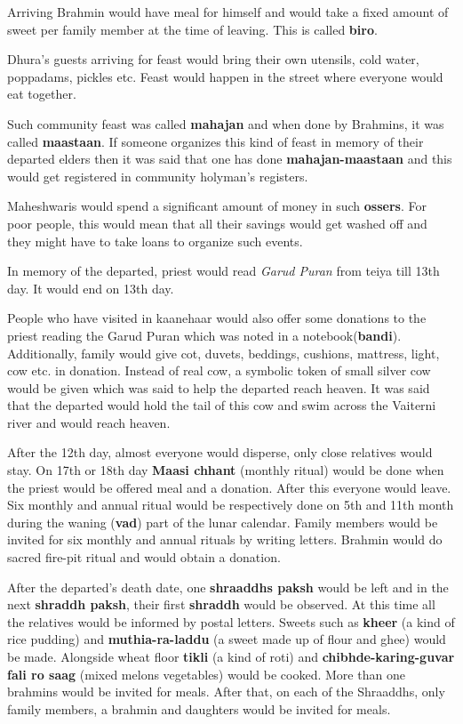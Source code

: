 Arriving Brahmin would have meal for himself and would take a fixed amount of
sweet per family member at the time of leaving. This is called \textbf{biro}.

Dhura's guests arriving for feast would bring their own utensils, cold water,
poppadams, pickles etc. Feast would happen in the street where everyone would
eat together.

Such community feast was called \textbf{mahajan} and when done by Brahmins, it
was called \textbf{maastaan}. If someone organizes this kind of feast in memory
of their departed elders then it was said that one has done
\textbf{mahajan-maastaan} and this would get registered in community holyman's
registers.

Maheshwaris would spend a significant amount of money in such \textbf{ossers}.
For poor people, this would mean that all their savings would get washed off
and they might have to take loans to organize such events.

In memory of the departed, priest would read \textit{Garud Puran} from teiya
till 13th day. It would end on 13th day.

People who have visited in kaanehaar would also offer some donations to the
priest reading the Garud Puran which was noted in a notebook(\textbf{bandi}).
Additionally, family would give cot, duvets, beddings, cushions, mattress,
light, cow etc. in donation. Instead of real cow, a symbolic token of small
silver cow would be given which was said to help the departed reach heaven. It
was said that the departed would hold the tail of this cow and swim across the
Vaiterni river and would reach heaven.

After the 12th day, almost everyone would disperse, only close relatives would
stay. On 17th or 18th day \textbf{Maasi chhant} (monthly ritual) would be done
when the priest would be offered meal and a donation. After this everyone would
leave. Six monthly and annual ritual would be respectively done on 5th and 11th
month during the waning (\textbf{vad}) part of the lunar calendar. Family
members would be invited for six monthly and annual rituals by writing letters.
Brahmin would do sacred fire-pit ritual and would obtain a donation.

After the departed's death date, one \textbf{shraaddhs paksh} would be left and
in the next \textbf{shraddh paksh}, their first \textbf{shraddh} would be
observed. At this time all the relatives would be informed by postal letters.
Sweets such as \textbf{kheer} (a kind of rice pudding) and
\textbf{muthia-ra-laddu} (a sweet made up of flour and ghee) would be made.
Alongside wheat floor \textbf{tikli} (a kind of roti) and
\textbf{chibhde-karing-guvar fali ro saag} (mixed melons vegetables) would be
cooked. More than one brahmins would be invited for meals. After that, on each
of the Shraaddhs, only family members, a brahmin and daughters would be invited
for meals.

